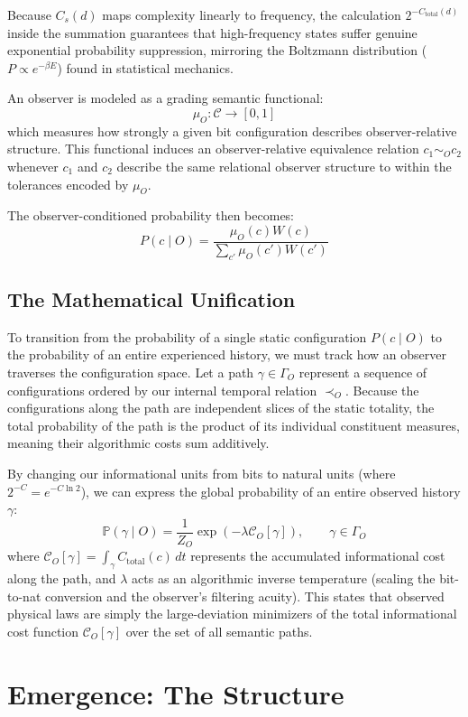 Because $C_s(d)$ maps complexity linearly to frequency, the calculation $2^{-C_{\text{total}}(d)}$ inside the summation guarantees that high-frequency states suffer genuine exponential probability suppression, mirroring the Boltzmann distribution ($P \propto e^{-\beta E}$) found in statistical mechanics.

An observer is modeled as a grading semantic functional:
\[
\mu_O : \mathcal{C} \to [0,1]
\]
which measures how strongly a given bit configuration describes observer-relative structure.
This functional induces an observer-relative equivalence relation $c_1 \sim_O c_2$ whenever $c_1$ and $c_2$ describe
the same relational observer structure to within the tolerances encoded by $\mu_O$. 

The observer-conditioned probability then becomes:
\[
P(c \mid O) = \frac{\mu_O(c)W(c)}{\sum_{c'} \mu_O(c')W(c')}
\]


\subsection*{The Mathematical Unification}

To transition from the probability of a single static configuration $P(c \mid O)$ to the probability of an entire experienced history,
we must track how an observer traverses the configuration space.
Let a path $\gamma \in \Gamma_O$ represent a sequence of configurations ordered by our internal temporal relation $\prec_O$.
Because the configurations along the path are independent slices of the static totality,
the total probability of the path is the product of its individual constituent measures, meaning their algorithmic costs sum additively.

By changing our informational units from bits to natural units (where $2^{-C} = e^{-C \ln 2}$), we can express the global probability of an entire observed history $\gamma$:
\[
\mathbb{P}(\gamma \mid O) = \frac{1}{Z_O} \exp\left(-\lambda\mathcal{C}_O[\gamma]\right), \qquad \gamma \in \Gamma_O
\]
where $\mathcal{C}_O[\gamma] = \int_{\gamma} C_{\text{total}}(c)\, dt$ represents the accumulated informational cost along the path, and $\lambda$ acts as an algorithmic inverse temperature (scaling the bit-to-nat conversion and the observer's filtering acuity).
This states that observed physical laws are simply the large-deviation minimizers of the total informational cost function $\mathcal{C}_O[\gamma]$ over the set of all semantic paths.



\section{Emergence: The Structure}

